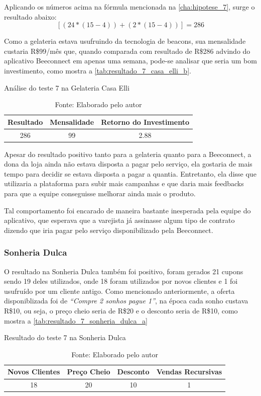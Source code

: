 Aplicando os números acima na fórmula mencionada na \autoref{cha:hipotese_7}, surge o resultado abaixo:
\[[(24 * (15 - 4)) + (2 * (15 - 4))] = 286\]

Como a gelateria estava usufruindo da tecnologia de beacons, sua mensalidade custaria R\$99/mês que, quando comparada com resultado de R\$286 advindo do aplicativo Beeconnect em apenas uma semana, pode-se analisar que seria um bom investimento, como mostra a \autoref{tab:resultado_7_casa_elli_b}. 

\begin{table}[H]
\centering
\caption{Análise do teste 7 na Gelateria Casa Elli}
\label{tab:resultado_7_casa_elli_b}
\begin{tabular}{|c|c|c|}
\hline
Resultado & Mensalidade & Retorno do Investimento \\ \hline
286             & 99          &   2.88 \\ \hline
\end{tabular}
\caption* {Fonte: Elaborado pelo autor}    
\end{table}

Apesar do resultado positivo tanto para a gelateria quanto para a Beeconnect, a dona da loja ainda não estava disposta a pagar pelo serviço, ela gostaria de mais tempo para decidir se estava disposta a pagar a quantia. Entretanto, ela disse que utilizaria a plataforma para subir mais campanhas e que daria mais feedbacks para que a equipe conseguisse melhorar ainda mais o produto.

Tal comportamento foi encarado de maneira bastante inesperada pela equipe do aplicativo, que esperava que a varejista já assinasse algum tipo de contrato dizendo que iria pagar pelo serviço disponibilizado pela Beeconnect.

\subsubsection{Sonheria Dulca}
\label{cha:resultado_sonheria_dulca}
O resultado na Sonheria Dulca também foi positivo, foram gerados 21 cupons sendo 19 deles utilizados, onde 18 foram utilizados por novos clientes e 1 foi usufruído por um cliente antigo. Como mencionado anteriormente, a oferta disponiblizada foi de \textit{\enquote{Compre 2 sonhos pague 1}}, na época cada sonho custava R\$10, ou seja, o preço cheio seria de R\$20 e o desconto seria de R\$10, como mostra a \autoref{tab:resultado_7_sonheria_dulca_a}

\begin{table}[H]
\centering
\caption{Resultado do teste 7 na Sonheria Dulca}
\label{tab:resultado_7_sonheria_dulca_a}
\begin{tabular}{|c|c|c|c|}
\hline
Novos Clientes & Preço Cheio & Desconto & Vendas Recursivas \\ \hline
18             & 20          & 10        & 1   \\ \hline
\end{tabular}
\caption* {Fonte: Elaborado pelo autor}    
\end{table}

